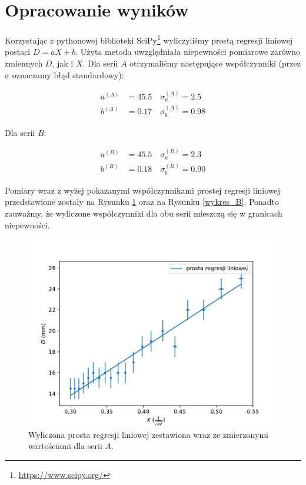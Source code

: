 \documentclass[a4paper]{article}
\begin{document}
\section{Opracowanie wyników}

Korzystając z pythonowej biblioteki SciPy\footnote{\url{https://www.scipy.org/}} wyliczyliśmy prostą regresji liniowej postaci $D = aX + b$.
Użyta metoda uwzględniała niepewności pomiarowe zarówno zmiennych $D$, jak i $X$.
Dla serii $A$ otrzymaliśmy następujące współczynniki (przez $\sigma$ oznaczamy błąd standardowy):

\begin{align*}
	a^{(A)} &= 45.5 \quad \sigma_a^{(A)} = 2.5 \\
	b^{(A)} &= 0.17 \quad \sigma_b^{(A)} = 0.98
\end{align*}

Dla serii $B$:

\begin{align*}
	a^{(B)} &= 45.5 \quad \sigma_a^{(B)} = 2.3 \\
	b^{(B)} &= 0.18 \quad \sigma_b^{(B)} = 0.90
\end{align*}

Pomiary wraz z wyżej pokazanymi współczynnikami prostej regresji liniowej przedstawione zostały na Rysunku \ref{wykres_A} oraz na Rysunku \ref{wykres_B}.
Ponadto zauważmy, że wyliczone współczynniki dla obu serii mieszczą się w granicach niepewności.

\begin{figure}[h]
\centering
\includegraphics[scale=0.7]{wykres_A.pdf}
\caption{Wyliczona prosta regresji liniowej zestawiona wraz ze zmierzonymi wartościami dla serii $A$.}
\label{wykres_A}
\end{figure}
\end{document}
